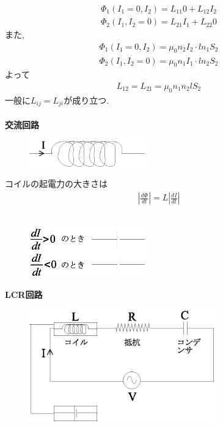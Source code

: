 \documentclass{jsarticle}
\begin{document}
\begin{eqnarray*}
\Phi_1(I_1=0,I_2) = L_{11}0+L_{12}I_2 \\
\Phi_2(I_1,I_2=0) = L_{21}I_1+L_{22}0
\end{eqnarray*}
また,
\begin{eqnarray*}
\Phi_1(I_1=0,I_2) = \mu_0 n_2 I_2 \cdot l n_1 S_2 \\
\Phi_2(I_1,I_2=0) = \mu_0 n_1 I_1 \cdot l n_2 S_2
\end{eqnarray*}
よって
\begin{eqnarray*}
L_{12}=L_{21}=\mu_0n_1n_2lS_2
\end{eqnarray*}
一般に$L_{ij}=L_{ji}$が成り立つ. \\
\\
{\bf 交流回路} \\

\begin{figure}[htbp]
 \begin{center}
  \includegraphics[width=50mm]{11.5.eps}
 \end{center}
 \caption{}
 \label{fig:one}
\end{figure}

コイルの起電力の大きさは
\begin{eqnarray*}
\left| \frac{d \Phi}{dt} \right| = L\left|\frac{d I}{dt} \right|
\end{eqnarray*}
\\

\begin{figure}[htbp]
 \begin{center}
  \includegraphics[width=50mm]{11.6.eps}
 \end{center}
 \caption{}
 \label{fig:one}
\end{figure}

\newpage

{\bf LCR回路} \\

\begin{figure}[htbp]
 \begin{center}
  \includegraphics[width=80mm]{11.7.eps}
 \end{center}
 \caption{}
 \label{fig:one}
\end{figure}
\end{document}
